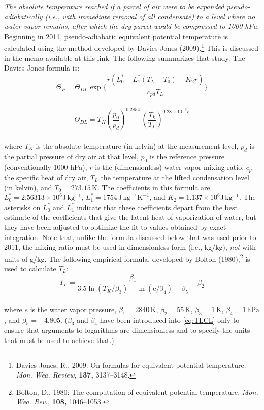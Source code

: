 \documentclass[
]{book}
\begin{document}
\emph{The absolute temperature reached if a parcel of air were to be expanded pseudo-adiabatically (i.e., with immediate removal of all condensate) to a level where no water vapor remains, after which the dry parcel would be compressed to 1000 hPa.} Beginning in 2011, pseudo-adiabatic equivalent potential temperature is calculated using the method developed by Davies-Jones (2009).\footnote{Davies-Jones, R., 2009: On formulas for equivalent potential temperature. \emph{Mon. Wea. Review,} \textbf{137,} 3137--3148.}
This is discussed in the memo available at this link. The following summarizes that study. The Davies-Jones formula is:\\
\begin{equation}
\Theta_{P}=\Theta_{DL}\exp\{\frac{r(L_{0}^{*}-L_{1}^{*}(T_{L}-T_{0})+K_{2}r)}{c_{pd}T_{L}}\}
\label{eq:THETAP}
\end{equation}\\
\begin{equation}
\Theta_{DL}=T_{K}(\frac{p_{0}}{p_{d}})^{0.2854}\,(\frac{T_{k}}{T_{L}})^{0.28\times10^{-3}r}
\label{eq:THETADL}
\end{equation}\\
where \(T_K\) is the absolute temperature (in kelvin) at the measurement level, \(p_d\) is the partial pressure of dry air at that level, \(p_0\) is the reference pressure (conventionally 1000 hPa), \(r\) is the (dimensionless) water vapor mixing ratio, \(c_p\) the specific heat of dry air, \(T_L\) the temperature at the lifted condensation level (in kelvin), and \(T_0=273.15\,\mathrm{K}\). The coefficients in this formula are \(L_0^* = 2.56313\times 10^6\mathrm{J\,kg^{-1}}\),
\(L_1^* = 1754\,\mathrm{J\,kg^{-1}K^{-1}}\), and \(K_2 = 1.137\times 10^6\mathrm{J\,kg^{-1}}\). The asterisks on \(L_0^*\) and \(L_1^*\) indicate that these coefficients depart from the best estimate of the coefficients that give the latent heat of vaporization of water, but they have been adjusted to optimize the fit to values obtained by exact integration. Note that, unlike the formula discussed below that was used prior to 2011, the mixing ratio must be used in dimensionless form (i.e., kg/kg), \emph{not} with units of g/kg. The following empirical formula, developed by Bolton (1980),\footnote{Bolton, D., 1980: The computation of equivalent potential temperature. \emph{Mon. Wea. Rev.,} \textbf{108,} 1046--1053.}
is used to calculate \(T_L\):\\
\begin{equation}
T_{L}=\frac{\beta_{1}}{3.5\ln(T_{K}/\beta_{3})-\ln(\mathrm{e/\beta_{4}})+\beta_{5}}+\beta_{2}
\label{eq:TLCL}
\end{equation}\\
where \(e\) is the water vapor pressure, \(\beta_1 = 2840\,\mathrm{K}\), \(\beta_2 = 55\,\mathrm{K}\), \(\beta_3 = 1\,\mathrm{K}\), \(\beta_4 = 1\,\mathrm{hPa}\), and \(\beta_5 = -4.805\). (\(\beta_3\) and \(\beta_4\) have been introduced into \eqref{eq:TLCL} only to ensure that arguments to logarithms are dimensionless and to specify the units that must be used to achieve that.)
\end{document}
